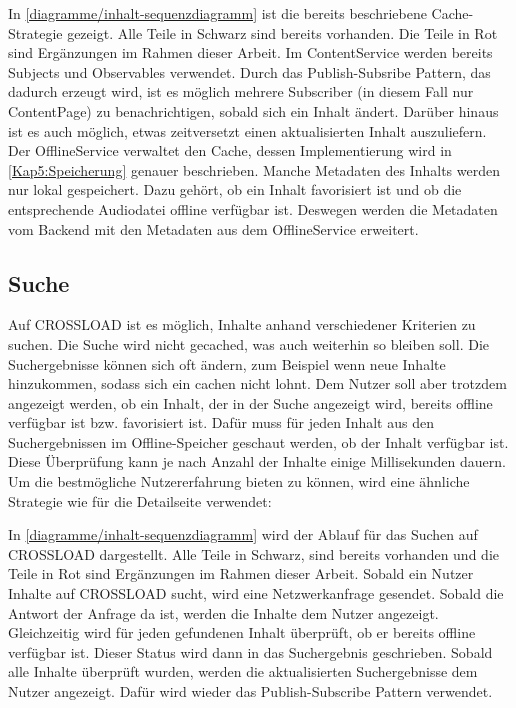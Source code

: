 
In \autoref{diagramme/inhalt-sequenzdiagramm} ist die bereits beschriebene Cache-Strategie gezeigt. Alle Teile in Schwarz sind bereits vorhanden. Die Teile in Rot sind Ergänzungen im Rahmen dieser Arbeit. Im ContentService werden bereits Subjects und Observables verwendet. Durch das Publish-Subsribe Pattern, das dadurch erzeugt wird, ist es möglich mehrere Subscriber (in diesem Fall nur ContentPage) zu benachrichtigen, sobald sich ein Inhalt ändert. Darüber hinaus ist es auch möglich, etwas zeitversetzt einen aktualisierten Inhalt auszuliefern. Der OfflineService verwaltet den Cache, dessen Implementierung wird in \autoref{Kap5:Speicherung} genauer beschrieben. Manche Metadaten des Inhalts werden nur lokal gespeichert. Dazu gehört, ob ein Inhalt favorisiert ist und ob die entsprechende Audiodatei offline verfügbar ist. Deswegen werden die Metadaten vom Backend mit den Metadaten aus dem OfflineService erweitert.

\subsection{Suche}
Auf CROSSLOAD ist es möglich, Inhalte anhand verschiedener Kriterien zu suchen. Die Suche wird nicht gecached, was auch weiterhin so bleiben soll. Die Suchergebnisse können sich oft ändern, zum Beispiel wenn neue Inhalte hinzukommen, sodass sich ein cachen nicht lohnt. Dem Nutzer soll aber trotzdem angezeigt werden, ob ein Inhalt, der in der Suche angezeigt wird, bereits offline verfügbar ist bzw. favorisiert ist. Dafür muss für jeden Inhalt aus den Suchergebnissen im Offline-Speicher geschaut werden, ob der Inhalt verfügbar ist. Diese Überprüfung kann je nach Anzahl der Inhalte einige Millisekunden dauern. Um die bestmögliche Nutzererfahrung bieten zu können, wird eine ähnliche Strategie wie für die Detailseite verwendet:


In \autoref{diagramme/inhalt-sequenzdiagramm} wird der Ablauf für das Suchen auf CROSSLOAD dargestellt. Alle Teile in Schwarz, sind bereits vorhanden und die Teile in Rot sind Ergänzungen im Rahmen dieser Arbeit. Sobald ein Nutzer Inhalte auf CROSSLOAD sucht, wird eine Netzwerkanfrage gesendet. Sobald die Antwort der Anfrage da ist, werden die Inhalte dem Nutzer angezeigt. Gleichzeitig wird für jeden gefundenen Inhalt überprüft, ob er bereits offline verfügbar ist. Dieser Status wird dann in das Suchergebnis geschrieben. Sobald alle Inhalte überprüft wurden, werden die aktualisierten Suchergebnisse dem Nutzer angezeigt. Dafür wird wieder das Publish-Subscribe Pattern verwendet. 

